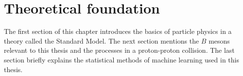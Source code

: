 \chapter{Theoretical foundation}

The first section of this chapter introduces the basics of particle physics in a theory called the Standard Model.
The next section mentions the $B$ mesons relevant to this thesis and the processes in a proton-proton collision.
The last section briefly explains the statistical methods of machine learning used in this thesis.




